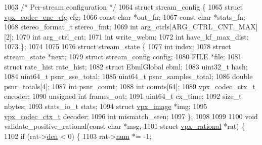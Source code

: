 \begin{DoxyCodeInclude}
{{{{{{{{{{{{{{{{{{{{{{{{{{{1063 \textcolor{comment}{/* Per-stream configuration */}
1064 \textcolor{keyword}{struct }stream\_config \{
1065   \textcolor{keyword}{struct }\hyperlink{structvpx__codec__enc__cfg}{vpx\_codec\_enc\_cfg}  cfg;
1066   \textcolor{keyword}{const} \textcolor{keywordtype}{char}               *out\_fn;
1067   \textcolor{keyword}{const} \textcolor{keywordtype}{char}               *stats\_fn;
1068   stereo\_format\_t           stereo\_fmt;
1069   \textcolor{keywordtype}{int}                       arg\_ctrls[ARG\_CTRL\_CNT\_MAX][2];
1070   \textcolor{keywordtype}{int}                       arg\_ctrl\_cnt;
1071   \textcolor{keywordtype}{int}                       write\_webm;
1072   \textcolor{keywordtype}{int}                       have\_kf\_max\_dist;
1073 \};
1074 
1075 
1076 \textcolor{keyword}{struct }stream\_state \{
1077   \textcolor{keywordtype}{int}                       index;
1078   \textcolor{keyword}{struct }stream\_state      *next;
1079   \textcolor{keyword}{struct }stream\_config      config;
1080   FILE                     *file;
1081   \textcolor{keyword}{struct }rate\_hist          rate\_hist;
1082   \textcolor{keyword}{struct }EbmlGlobal         ebml;
1083   uint32\_t                  hash;
1084   uint64\_t                  psnr\_sse\_total;
1085   uint64\_t                  psnr\_samples\_total;
1086   \textcolor{keywordtype}{double}                    psnr\_totals[4];
1087   \textcolor{keywordtype}{int}                       psnr\_count;
1088   \textcolor{keywordtype}{int}                       counts[64];
1089   \hyperlink{structvpx__codec__ctx}{vpx\_codec\_ctx\_t}           encoder;
1090   \textcolor{keywordtype}{unsigned} \textcolor{keywordtype}{int}              frames\_out;
1091   uint64\_t                  cx\_time;
1092   \textcolor{keywordtype}{size\_t}                    nbytes;
1093   stats\_io\_t                stats;
1094   \textcolor{keyword}{struct }\hyperlink{structvpx__image}{vpx\_image}         *img;
1095   \hyperlink{structvpx__codec__ctx}{vpx\_codec\_ctx\_t}           decoder;
1096   \textcolor{keywordtype}{int}                       mismatch\_seen;
1097 \};
1098 
1099 
1100 \textcolor{keywordtype}{void} validate\_positive\_rational(\textcolor{keyword}{const} \textcolor{keywordtype}{char}          *msg,
1101                                 \textcolor{keyword}{struct} \hyperlink{structvpx__rational}{vpx\_rational} *rat) \{
1102   \textcolor{keywordflow}{if} (rat->\hyperlink{structvpx__rational_a29dd2ab4001377b3aa21885ef969759f}{den} < 0) \{
1103     rat->\hyperlink{structvpx__rational_ae7774f21a22c9bef3aa73156c79f4731}{num} *= -1;
}}}}}}}}}}}}}}}}}}}}}}}}}}}
\end{DoxyCodeInclude}

